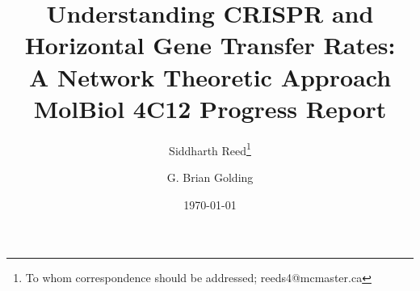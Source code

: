 \documentclass[12pt,letter]{article}
\begin{document}

\title{Understanding CRISPR and Horizontal Gene Transfer Rates:\\\vspace{0.2cm}
        A Network Theoretic Approach\\ \vspace{0.5cm}
       \Large MolBiol 4C12 Progress Report}
\author[1]{Siddharth Reed\thanks{To whom correspondence should be addressed; reeds4@mcmaster.ca}}
\author[1]{G. Brian Golding\vspace{-0.45cm}}
\date{\today}
\maketitle

\newpage
\linespread{1.25}%










\printbibliography
\end{document}
